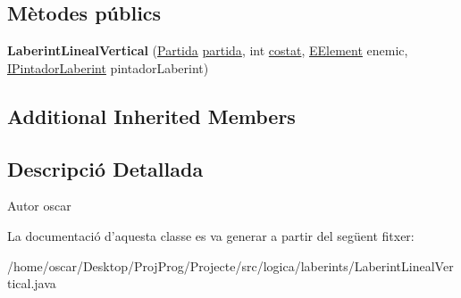 \subsection*{Mètodes públics}
\begin{DoxyCompactItemize}
\item 
\hypertarget{classlogica_1_1laberints_1_1_laberint_lineal_vertical_a98a5be8e42c30d6f6ad03e5c1e635c4b}{{\bfseries Laberint\+Lineal\+Vertical} (\hyperlink{classlogica_1_1_partida}{Partida} \hyperlink{classlogica_1_1laberints_1_1_laberint_a7183ce070714f73e078bb36e8c21b575}{partida}, int \hyperlink{classlogica_1_1laberints_1_1_laberint_ae874ac4889592b811709f5b967d85286}{costat}, \hyperlink{enumlogica_1_1enumeracions_1_1_e_element}{E\+Element} enemic, \hyperlink{interfaceinterficie_1_1_i_pintador_laberint}{I\+Pintador\+Laberint} pintador\+Laberint)}\label{classlogica_1_1laberints_1_1_laberint_lineal_vertical_a98a5be8e42c30d6f6ad03e5c1e635c4b}

\end{DoxyCompactItemize}
\subsection*{Additional Inherited Members}


\subsection{Descripció Detallada}
\begin{DoxyAuthor}{Autor}
oscar 
\end{DoxyAuthor}


La documentació d'aquesta classe es va generar a partir del següent fitxer\+:\begin{DoxyCompactItemize}
\item 
/home/oscar/\+Desktop/\+Proj\+Prog/\+Projecte/src/logica/laberints/Laberint\+Lineal\+Vertical.\+java\end{DoxyCompactItemize}

